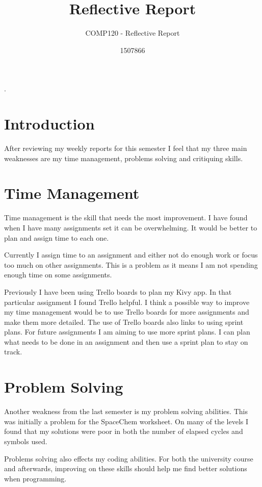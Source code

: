 \documentclass{scrartcl}
\title{Reflective Report}
\subtitle{COMP120 - Reflective Report}
\author{1507866}
\begin{document}
	
\maketitle
	
.
	
\section{Introduction}
After reviewing my weekly reports for this semester I feel that my three main weaknesses are my time management, problems solving and critiquing skills.

\section{Time Management}
Time management is the skill that needs the most improvement. I have found when I have many assignments set it can be overwhelming. It would be better to plan and assign time to each one.

Currently I assign time to an assignment and either not do enough work or focus too much on other assignments. This is a problem as it means I am not spending enough time on some assignments.

Previously I have been using Trello boards to plan my Kivy app. In that particular assignment I found Trello helpful. I think a possible way to improve my time management would be to use Trello boards for more assignments and make them more detailed. The use of Trello boards also links to using sprint plans. For future assignments I am aiming to use more sprint plans. I can plan what needs to be done in an assignment and then use a sprint plan to stay on track. 


\section{Problem Solving}
Another weakness from the last semester is my problem solving abilities. This was initially a problem for the SpaceChem worksheet. On many of the levels I found that my solutions were poor in both the number of elapsed cycles and symbols used.

Problems solving also effects my coding abilities. For both the university course and afterwards, improving on these skills should help me find better solutions when programming.
\end{document}
